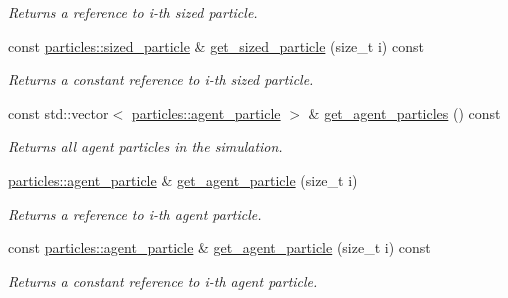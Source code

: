 \begin{DoxyCompactItemize}
\begin{DoxyCompactList}\small\item\em Returns a reference to i-\/th sized particle. \end{DoxyCompactList}\item 
\mbox{\label{classphysim_1_1simulator_a593cbb6a85d914bd4044cb4db6cc523b}} 
const \hyperlink{classphysim_1_1particles_1_1sized__particle}{particles\+::sized\+\_\+particle} \& \hyperlink{classphysim_1_1simulator_a593cbb6a85d914bd4044cb4db6cc523b}{get\+\_\+sized\+\_\+particle} (size\+\_\+t i) const
\begin{DoxyCompactList}\small\item\em Returns a constant reference to i-\/th sized particle. \end{DoxyCompactList}\item 
const std\+::vector$<$ \hyperlink{classphysim_1_1particles_1_1agent__particle}{particles\+::agent\+\_\+particle} $>$ \& \hyperlink{classphysim_1_1simulator_a043656dfeb0ce60416c234abb2280383}{get\+\_\+agent\+\_\+particles} () const
\begin{DoxyCompactList}\small\item\em Returns all agent particles in the simulation. \end{DoxyCompactList}\item 
\mbox{\label{classphysim_1_1simulator_a1b083b545660929082e1f646ff06d10f}} 
\hyperlink{classphysim_1_1particles_1_1agent__particle}{particles\+::agent\+\_\+particle} \& \hyperlink{classphysim_1_1simulator_a1b083b545660929082e1f646ff06d10f}{get\+\_\+agent\+\_\+particle} (size\+\_\+t i)
\begin{DoxyCompactList}\small\item\em Returns a reference to i-\/th agent particle. \end{DoxyCompactList}\item 
\mbox{\label{classphysim_1_1simulator_a6e285c59b113d384a9121e619f8fbc4f}} 
const \hyperlink{classphysim_1_1particles_1_1agent__particle}{particles\+::agent\+\_\+particle} \& \hyperlink{classphysim_1_1simulator_a6e285c59b113d384a9121e619f8fbc4f}{get\+\_\+agent\+\_\+particle} (size\+\_\+t i) const
\begin{DoxyCompactList}\small\item\em Returns a constant reference to i-\/th agent particle. \end{DoxyCompactList}\item 

\end{DoxyCompactItemize}
